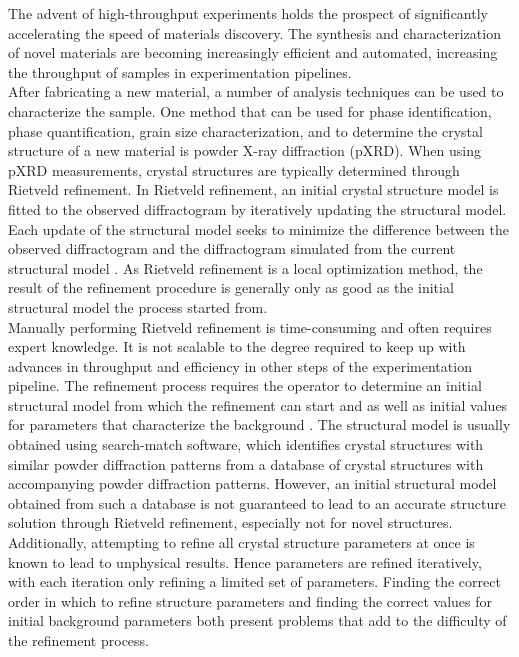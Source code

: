 The advent of high-throughput experiments holds the prospect of significantly accelerating the speed of materials discovery\cite{Liu2019}. The synthesis and characterization of novel materials are becoming increasingly efficient and automated, increasing the throughput of samples in experimentation pipelines\cite{MacLeod2019, Ludwig2019, Ozaki2020}. \\

After fabricating a new material, a number of analysis techniques can be used to characterize the sample. One method that can be used for phase identification, phase quantification, grain size characterization, and to determine the crystal structure of a new material is powder X-ray diffraction (pXRD). 
When using pXRD measurements, crystal structures are typically determined through Rietveld refinement. In Rietveld refinement, an initial crystal structure model is fitted to the observed diffractogram by iteratively updating the structural model. Each update of the structural model seeks to minimize the difference between the observed diffractogram and the diffractogram simulated from the current structural model \cite{Dinnebier2019, Cano2021}. As Rietveld refinement is a local optimization method, the result of the refinement procedure is generally only as good as the initial structural model the process started from. \\

Manually performing Rietveld refinement is time-consuming and often requires expert knowledge. It is not scalable to the degree required to keep up with advances in throughput and efficiency in other steps of the experimentation pipeline. The refinement process requires the operator to determine an initial structural model from which the refinement can start and as well as initial values for parameters that characterize the background \cite{mccusker1999}. The structural model is usually obtained using search-match software, which identifies crystal structures with similar powder diffraction patterns from a database of crystal structures with accompanying powder diffraction patterns. However, an initial structural model obtained from such a database is not guaranteed to lead to an accurate structure solution through Rietveld refinement, especially not for novel structures. Additionally, attempting to refine all crystal structure parameters at once is known to lead to unphysical results\cite{Ozaki2020}. Hence parameters are refined iteratively, with each iteration only refining a limited set of parameters. Finding the correct order in which to refine structure parameters and finding the correct values for initial background parameters both present problems that add to the difficulty of the refinement process.\\

